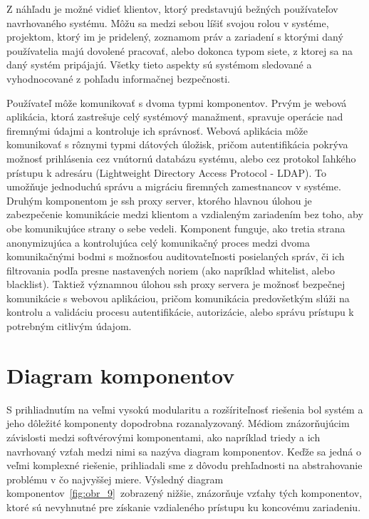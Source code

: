 Z náhľadu je možné vidieť klientov, ktorý predstavujú bežných používateľov navrhovaného systému.
Môžu sa medzi sebou líšiť svojou rolou v systéme, projektom, ktorý im je pridelený, zoznamom práv a zariadení s ktorými
daný používatelia majú dovolené pracovať, alebo dokonca typom siete, z ktorej sa na daný systém pripájajú.
Všetky tieto aspekty sú systémom sledované a vyhodnocované z pohľadu informačnej bezpečnosti.

Používateľ môže komunikovať s dvoma typmi komponentov.
Prvým je webová aplikácia, ktorá zastrešuje celý systémový manažment, spravuje operácie nad firemnými údajmi a kontroluje
ich správnosť.
Webová aplikácia môže komunikovať s rôznymi typmi dátových úložisk, pričom autentifikácia pokrýva možnosť prihlásenia cez
vnútornú databázu systému, alebo cez protokol ľahkého prístupu k adresáru (Lightweight Directory Access Protocol - LDAP).
To umožňuje jednoduchú správu a migráciu firemných zamestnancov v systéme.
Druhým komponentom je ssh proxy server, ktorého hlavnou úlohou je zabezpečenie komunikácie medzi klientom a vzdialeným
zariadením bez toho, aby obe komunikujúce strany o sebe vedeli.
Komponent funguje, ako tretia strana anonymizujúca a kontrolujúca celý komunikačný proces medzi dvoma komunikačnými bodmi s možnosťou
auditovateľnosti posielaných správ, či ich filtrovania podľa presne nastavených noriem (ako napríklad whitelist, alebo blacklist).
Taktiež významnou úlohou ssh proxy servera je možnosť bezpečnej komunikácie s webovou aplikáciou, pričom komunikácia predovšetkým
slúži na kontrolu a validáciu procesu autentifikácie, autorizácie, alebo správu prístupu k potrebným citlivým údajom.

\section{Diagram komponentov}\label{sec:diagram-komponentov}

S prihliadnutím na veľmi vysokú modularitu a rozšíriteľnosť riešenia bol systém a jeho dôležité komponenty dopodrobna rozanalyzovaný.
Médiom znázorňujúcim závislosti medzi softvérovými komponentami, ako napríklad triedy a ich navrhovaný vzťah medzi
nimi sa nazýva diagram komponentov.
Keďže sa jedná o veľmi komplexné riešenie, prihliadali sme z dôvodu prehľadnosti na abstrahovanie problému v čo najvyššej miere.
Výsledný diagram komponentov~\ref{fig:obr_9}~zobrazený nižšie, znázorňuje vzťahy tých komponentov, ktoré sú nevyhnutné pre
získanie vzdialeného prístupu ku koncovému zariadeniu.

